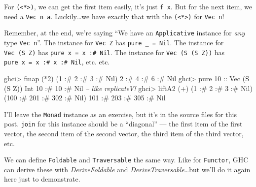 \documentclass[]{article}
\newenvironment{Shaded}{}{}
\newcommand{\DataTypeTok}[1]{\textcolor[rgb]{0.56,0.13,0.00}{{#1}}}
\newcommand{\DecValTok}[1]{\textcolor[rgb]{0.25,0.63,0.44}{{#1}}}
\newcommand{\CommentTok}[1]{\textcolor[rgb]{0.38,0.63,0.69}{\textit{{#1}}}}
\newcommand{\OtherTok}[1]{\textcolor[rgb]{0.00,0.44,0.13}{{#1}}}
\newcommand{\FunctionTok}[1]{\textcolor[rgb]{0.02,0.16,0.49}{{#1}}}
\newcommand{\NormalTok}[1]{{#1}}
\begin{document}
For \texttt{(\textless{}*\textgreater{})}, we can get the first item easily,
it's just \texttt{f\ x}. But for the next item, we need a \texttt{Vec\ n\ a}.
Luckily\ldots{}we have exactly that with the
\texttt{(\textless{}*\textgreater{})} for \texttt{Vec\ n}!

Remember, at the end, we're saying ``We have an \texttt{Applicative} instance
for \emph{any} type \texttt{Vec\ n}''. The instance for \texttt{Vec\ Z} has
\texttt{pure\ \_\ =\ Nil}. The instance for \texttt{Vec\ (S\ Z)} has
\texttt{pure\ x\ =\ x\ :\#\ Nil}. The instance for \texttt{Vec\ (S\ (S\ Z))} has
\texttt{pure\ x\ =\ x\ :\#\ x\ :\#\ Nil}, etc. etc.

\begin{Shaded}
\begin{Highlighting}[]
\NormalTok{ghci}\FunctionTok{>} \NormalTok{fmap (}\FunctionTok{*}\DecValTok{2}\NormalTok{) (}\DecValTok{1} \FunctionTok{:#} \DecValTok{2} \FunctionTok{:#} \DecValTok{3} \FunctionTok{:#} \DataTypeTok{Nil}\NormalTok{)}
\DecValTok{2} \FunctionTok{:#} \DecValTok{4} \FunctionTok{:#} \DecValTok{6} \FunctionTok{:#} \DataTypeTok{Nil}
\NormalTok{ghci}\FunctionTok{>} \NormalTok{pure }\DecValTok{10}\OtherTok{ ::} \DataTypeTok{Vec} \NormalTok{(}\DataTypeTok{S} \NormalTok{(}\DataTypeTok{S} \DataTypeTok{Z}\NormalTok{)) }\DataTypeTok{Int}
\DecValTok{10} \FunctionTok{:#} \DecValTok{10} \FunctionTok{:#} \DataTypeTok{Nil}         \CommentTok{-- like replicateV!}
\NormalTok{ghci}\FunctionTok{>} \NormalTok{liftA2 (}\FunctionTok{+}\NormalTok{) (}\DecValTok{1} \FunctionTok{:#} \DecValTok{2} \FunctionTok{:#} \DecValTok{3} \FunctionTok{:#} \DataTypeTok{Nil}\NormalTok{) (}\DecValTok{100} \FunctionTok{:#} \DecValTok{201} \FunctionTok{:#} \DecValTok{302} \FunctionTok{:#} \DataTypeTok{Nil}\NormalTok{)}
\DecValTok{101} \FunctionTok{:#} \DecValTok{203} \FunctionTok{:#} \DecValTok{305} \FunctionTok{:#} \DataTypeTok{Nil}
\end{Highlighting}
\end{Shaded}

I'll leave the \texttt{Monad} instance as an exercise, but it's in the source
files for this post. \texttt{join} for this instance should be a ``diagonal''
--- the first item of the first vector, the second item of the second vector,
the third item of the third vector, etc.

We can define \texttt{Foldable} and \texttt{Traversable} the same way. Like for
\texttt{Functor}, GHC can derive these with \emph{DeriveFoldable} and
\emph{DeriveTraversable}\ldots{}but we'll do it again here just to demonstrate.
\end{document}
